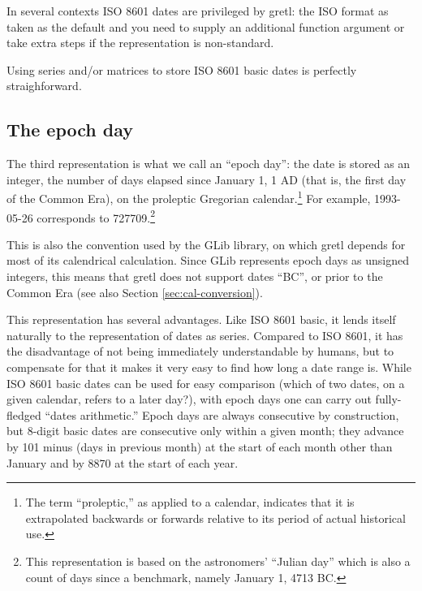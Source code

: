 In several contexts ISO 8601 dates are privileged by gretl: the ISO
format as taken as the default and you need to supply an additional
function argument or take extra steps if the representation is
non-standard.

Using series and/or matrices to store ISO 8601 basic dates is
perfectly straighforward.

\subsection{The epoch day}
\label{sec:cal-epochday}

The third representation is what we call an ``epoch day'': the date is
stored as an integer, the number of days elapsed since January 1, 1 AD
(that is, the first day of the Common Era), on the proleptic Gregorian
calendar.\footnote{The term ``proleptic,'' as applied to a calendar,
  indicates that it is extrapolated backwards or forwards relative to
  its period of actual historical use.} For example, 1993-05-26
corresponds to 727709.\footnote{This representation is based on the
astronomers' ``Julian day'' which is also a count of days since a
benchmark, namely January 1, 4713 BC.}

This is also the convention used by the \textsf{GLib} library, on
which gretl depends for most of its calendrical calculation. Since
\textsf{GLib} represents epoch days as unsigned integers, this means
that gretl does not support dates ``BC'', or prior to the Common Era
(see also Section \ref{sec:cal-conversion}).

This representation has several advantages. Like ISO 8601 basic, it
lends itself naturally to the representation of dates as
series. Compared to ISO 8601, it has the disadvantage of not being
immediately understandable by humans, but to compensate for that it
makes it very easy to find how long a date range is. While ISO 8601
basic dates can be used for easy comparison (which of two dates, on a
given calendar, refers to a later day?), with epoch days one can carry
out fully-fledged ``dates arithmetic.''  Epoch days are always
consecutive by construction, but 8-digit basic dates are consecutive
only within a given month; they advance by 101 minus (days in previous
month) at the start of each month other than January and by 8870 at
the start of each year.


